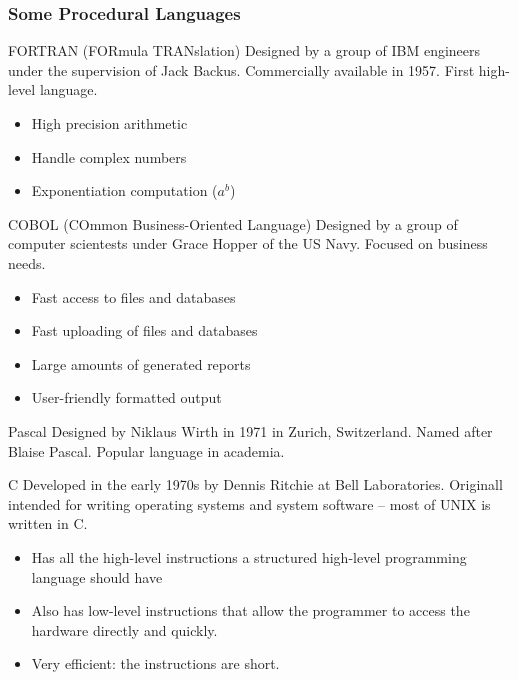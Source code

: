\documentclass[\main/notes.tex]{subfiles}
\begin{document}
				\subsubsection{Some Procedural Languages}
					\begin{definition}{FORTRAN (FORmula TRANslation)}
						Designed by a group of IBM engineers under the supervision of Jack Backus. Commercially available in 1957. First high-level language.
						\begin{itemize}[nosep]
							\item High precision arithmetic
							\item Handle complex numbers
							\item Exponentiation computation ($a^{b}$)
						\end{itemize}
					\end{definition}
					\begin{definition}{COBOL (COmmon Business-Oriented Language)}
						Designed by a group of computer scientests under Grace Hopper of the US Navy. Focused on business needs.
						\begin{itemize}[nosep]
							\item Fast access to files and databases
							\item Fast uploading of files and databases
							\item Large amounts of generated reports
							\item User-friendly formatted output
						\end{itemize}
					\end{definition}
					\begin{definition}{Pascal}
						Designed by Niklaus Wirth in 1971 in Zurich, Switzerland. Named after Blaise Pascal. Popular language in academia.
					\end{definition}
					\begin{definition}{C}
						Developed in the early 1970s by Dennis Ritchie at Bell Laboratories. Originall intended for writing operating systems and system software -- most of UNIX is written in C.
						\begin{itemize}[nosep]
							\item Has all the high-level instructions a structured high-level programming language should have
							\item Also has low-level instructions that allow the programmer to access the hardware directly and quickly.
							\item Very efficient: the instructions are short.
						\end{itemize}
					\end{definition}
\end{document}
